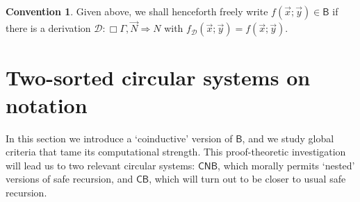 \documentclass[manuscript,screen]{acmart}
\newcommand{\anupam}[1]{\todo{A: #1}}
\theoremstyle{definition}
\newtheorem{conv}[thm]{Convention}
\theoremstyle{remark}
\newcommand{\n}{N}
\newcommand{\sq}{\Box}
\newcommand{\sqn}{{\sq\n}}
\newcommand{\sn}{\sqn}
\newcommand{\denot}[1]{f_{#1}}
\newcommand{\bc}{\mathsf{B}}
\newcommand{\nested}{\mathsf{N}}
\newcommand{\seqar}{\Rightarrow}
\newcommand{\der}{\mathcal{D}}
\newcommand{\pder}[1]{\der_{#1}}
\newcommand{\cut}{\mathsf{cut}}
\newcommand{\cyclic}{\mathsf{C}}
\newcommand{\cbc}{\cyclic\bc}
\newcommand{\ncbc}{\cyclic\nested\bc}
\begin{document}


\begin{conv}
Given  above, 
we shall henceforth freely write $f(\vec x ; \vec y) \in \bc$ if there is a derivation $\der:\sq\Gamma, \vec \n \seqar \n$ with $\denot \der (\vec x; \vec y) = f(\vec x;\vec y) $.
\end{conv}


\section{Two-sorted circular systems on notation}\label{sec:two-tiered-circular-systems-on-notation}

In this section we  introduce a `coinductive' version of $\bc$,  and we study global  criteria that tame its computational strength. 
This proof-theoretic investigation will lead us to two relevant circular systems: $\ncbc$, which morally permits  `nested' versions of safe recursion, and $\cbc$, which will turn out to be closer to usual safe recursion.
\end{document}
